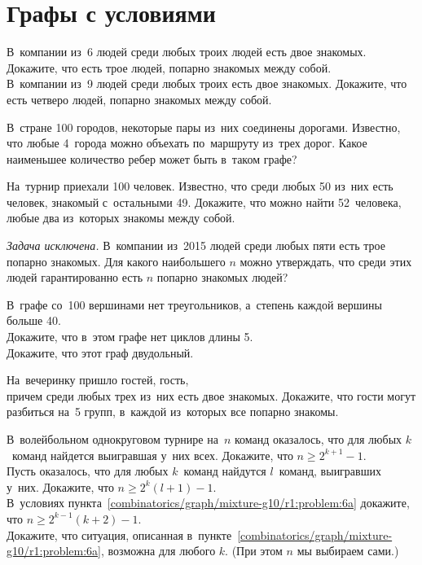 
\section*{Графы с условиями}


\begin{problems}

\item
\subproblem
В~компании из~6 людей среди любых троих людей есть двое знакомых.
Докажите, что есть трое людей, попарно знакомых между собой.
\\
\subproblem
В~компании из~9 людей среди любых троих есть двое знакомых.
Докажите, что есть четверо людей, попарно знакомых между собой.

\item
В~стране 100 городов, некоторые пары из~них соединены дорогами.
Известно, что любые 4~города можно объехать по~маршруту из~трех дорог.
Какое наименьшее количество ребер может быть в~таком графе?

\item
На~турнир приехали 100 человек.
Известно, что среди любых 50 из~них есть человек, знакомый с~остальными 49.
Докажите, что можно найти 52~человека, любые два из~которых знакомы между
собой.

\item \emph{Задача исключена.}
В~компании из~2015 людей среди любых пяти есть трое попарно знакомых.
Для какого наибольшего $n$ можно утверждать, что среди этих людей
гарантированно есть $n$ попарно знакомых людей?

\item
В~графе со~100 вершинами нет треугольников, а~степень каждой вершины больше 40.
\\
\subproblem
Докажите, что в~этом графе нет циклов длины 5.
\\
\subproblem
Докажите, что этот граф двудольный.

\item
На~вечеринку пришло
\quad
{} гостей,
\quad
{} гость,
\\
причем среди любых трех из~них есть двое знакомых.
Докажите, что гости могут разбиться на~5 групп, в~каждой из~которых
все попарно знакомы.

\item
\subproblem
\label{combinatorics/graph/mixture-g10/r1:problem:6a}%
В~волейбольном однокруговом турнире на~$n$ команд оказалось, что для любых
$k$~команд найдется выигравшая у~них всех.
Докажите, что\enspace
$n \geq 2^{k+1} - 1$.
\\
\subproblem
Пусть оказалось, что для любых $k$~команд найдутся $l$~команд, выигравших
у~них.
Докажите, что\enspace
$n \geq 2^k (l + 1) - 1$.
\\
\subproblem
В~условиях пункта~\ref{combinatorics/graph/mixture-g10/r1:problem:6a}
докажите, что\enspace
$n \geq 2^{k-1} (k + 2) - 1$.
\\
\subproblem
Докажите, что ситуация, описанная
в~пункте~\ref{combinatorics/graph/mixture-g10/r1:problem:6a},
возможна для любого $k$. (При этом $n$ мы выбираем сами.)

\end{problems}

